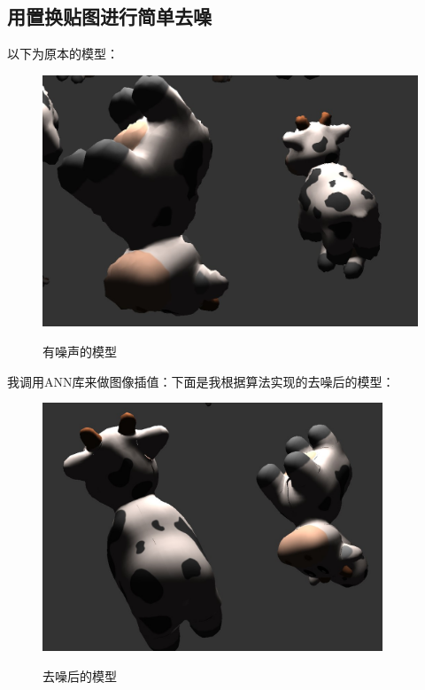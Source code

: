 \documentclass{article}
\begin{document}
	\subsection{用置换贴图进行简单去噪}
	以下为原本的模型：
	\begin{figure}[htb]
		\caption{\label{table.label} 有噪声的模型} \centering
		\begin{center}
			\includegraphics[width=5in]{noise.jpg}
			\label{figure.label}
		\end{center}
	\end{figure}

	我调用ANN库来做图像插值：下面是我根据算法实现的去噪后的模型：\clearpage
	\begin{figure}[htb]
		\caption{\label{table.label} 去噪后的模型} \centering
		\begin{center}
			\includegraphics[width=4in]{denoise1.jpg}
			\label{figure.label}
		\end{center}
	\end{figure}
\end{document}
